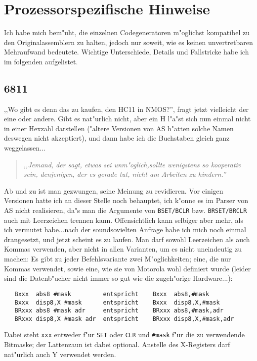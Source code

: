 \documentclass[12pt,a4paper,twoside]{report}
\newcommand{\tty}[1]{{\tt #1}}
\begin{document}

\cleardoublepage
\chapter{Prozessorspezifische Hinweise}

Ich habe mich bem"uht, die einzelnen Codegeneratoren m"oglichst kompatibel
zu den Originalassemblern zu halten, jedoch nur soweit, wie es keinen
unvertretbaren Mehraufwand bedeutete.  Wichtige Unterschiede, Details und
Fallstricke habe ich im folgenden aufgelistet.


\section{6811}

,,Wo gibt es denn das zu kaufen, den HC11 in NMOS?'', fragt jetzt vielleicht
der eine oder andere.  Gibt es nat"urlich nicht, aber ein H l"a"st sich nun
einmal nicht in einer Hexzahl darstellen ("altere Versionen von AS h"atten
solche Namen deswegen nicht akzeptiert), und dann habe ich die Buchstaben
gleich ganz weggelassen...
\par
\begin{quote}{\it
,,Jemand, der sagt, etwas sei unm"oglich,sollte wenigstens so kooperativ
sein, denjenigen, der es gerade tut, nicht am Arbeiten zu hindern.''
}\end{quote}
Ab und zu ist man gezwungen, seine Meinung zu revidieren.  Vor einigen
Versionen hatte ich an dieser Stelle noch behauptet, ich k"onne es im Parser
von AS nicht realisieren, da"s man die Argumente von \tty{BSET/BCLR} bzw.
\tty{BRSET/BRCLR} auch mit Leerzeichen trennen kann.  Offensichtlich kann
selbiger aber mehr, als ich vermutet habe...nach der soundsovielten Anfrage
habe ich mich noch einmal drangesetzt, und jetzt scheint es zu laufen.  Man
darf sowohl Leerzeichen als auch Kommas verwenden, aber nicht in allen
Varianten, um es nicht uneindeutig zu machen:  Es gibt zu jeder
Befehlsvariante zwei M"oglichkeiten; eine, die nur Kommas verwendet, sowie
eine, wie sie von Motorola wohl definiert wurde (leider sind die Datenb"ucher
nicht immer so gut wie die zugeh"orige Hardware...):
\begin{verbatim}
   Bxxx  abs8 #mask         entspricht    Bxxx  abs8,#mask
   Bxxx  disp8,X #mask      entspricht    Bxxx  disp8,X,#mask
   BRxxx abs8 #mask adr     entspricht    BRxxx abs8,#mask,adr
   BRxxx disp8,X #mask adr  entspricht    BRxxx disp8,X,#mask,adr
\end{verbatim}
Dabei steht \tty{xxx} entweder f"ur \tty{SET} oder \tty{CLR} und \tty{\#mask}
f"ur die zu verwendende Bitmaske; der Lattenzaun ist dabei optional.
Anstelle des X-Registers darf nat"urlich auch Y verwendet werden.
\end{document}
